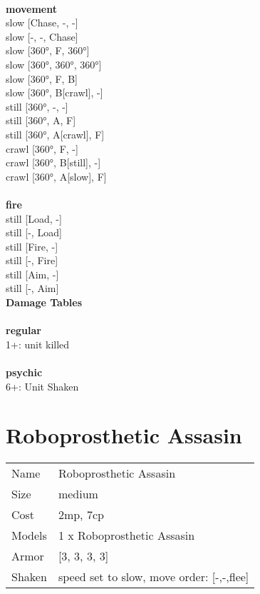 \ \\ {\bf movement } \\
slow [Chase, -, -] \\
slow [-, -, Chase] \\
slow [360°, F, 360°] \\
slow [360°, 360°, 360°] \\
slow [360°, F, B] \\
slow [360°, B[crawl], -] \\
still [360°, -, -] \\
still [360°, A, F] \\
still [360°, A[crawl], F] \\
crawl [360°, F, -] \\
crawl [360°, B[still], -] \\
crawl [360°, A[slow], F] \\
\ \\ {\bf fire } \\
still [Load, -] \\
still [-, Load] \\
still [Fire, -] \\
still [-, Fire] \\
still [Aim, -] \\
still [-, Aim] \\


{\bf Damage Tables} \\
\ \\ {\bf regular } \\
1+: unit killed \\
\ \\ {\bf psychic } \\
6+: Unit Shaken \\










\pagebreak\pagebreak

\section{ Roboprosthetic Assasin }

\begin{tabular}{ll}
  Name & Roboprosthetic Assasin \\
  Size & medium\\
  Cost & 2mp, 7cp\\
  Models & 1 x Roboprosthetic Assasin\\
  Armor & [3, 3, 3, 3]\\
  Shaken & speed set to slow, move order: [-,-,flee]\\
\end{tabular}

